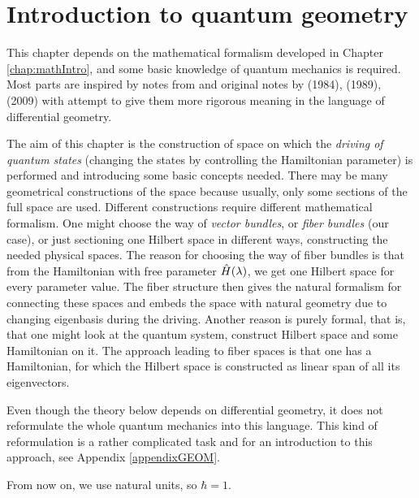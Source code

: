 \chapter{Introduction to quantum geometry}
\label{chap:driving}
This chapter depends on the mathematical formalism developed in Chapter \ref{chap:mathIntro}, and some basic knowledge of quantum mechanics is required. Most parts are inspired by notes from \citet{kolodrubez} and original notes by \citet{berry1984}(1984), \cite{berry1989}(1989), \cite{berry2009}(2009) with attempt to give them more rigorous meaning in the language of differential geometry. 

The aim of this chapter is the construction of space on which the \emph{driving of quantum states} (changing the states by controlling the Hamiltonian parameter) is performed and introducing some basic concepts needed. There may be many geometrical constructions of the space because usually, only some sections of the full space are used. Different constructions require different mathematical formalism. One might choose the way of \emph{vector bundles}, or \emph{fiber bundles} (our case), or just sectioning one Hilbert space in different ways, constructing the needed physical spaces. The reason for choosing the way of fiber bundles is that from the Hamiltonian with free parameter $\hat{H}(\lambda)$, we get one Hilbert space for every parameter value. The fiber structure then gives the natural formalism for connecting these spaces and embeds the space with natural geometry due to changing eigenbasis during the driving. Another reason is purely formal, that is, that one might look at the quantum system, construct Hilbert space and some Hamiltonian on it. The approach leading to fiber spaces is that one has a Hamiltonian, for which the Hilbert space is constructed as linear span of all its eigenvectors.

Even though the theory below depends on differential geometry, it does not reformulate the whole quantum mechanics into this language. This kind of reformulation is a rather complicated task and for an introduction to this approach, see Appendix \ref{appendixGEOM}.

From now on, we use natural units, so $\hbar=1$.

